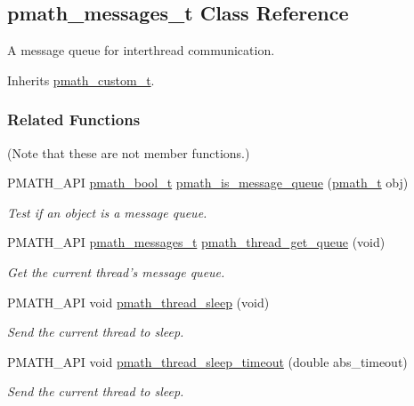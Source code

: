\hypertarget{classpmath__messages__t}{
\subsection{pmath\_\-messages\_\-t Class Reference}
\label{classpmath__messages__t}
}
A message queue for interthread communication.  


Inherits \hyperlink{classpmath__custom__t}{pmath\_\-custom\_\-t}.

\subsubsection*{Related Functions}
(Note that these are not member functions.) \begin{CompactItemize}
\item 
PMATH\_\-API \hyperlink{group__general__types_gc92090cb0b56345d6c379ed2341d4ef4}{pmath\_\-bool\_\-t} \hyperlink{group__threadmsg_g93b45ad8c3063c94602c8bbaaf3c2613}{pmath\_\-is\_\-message\_\-queue} (\hyperlink{classpmath__t}{pmath\_\-t} obj)
\begin{CompactList}\small\item\em Test if an object is a message queue. \item\end{CompactList}\item 
PMATH\_\-API \hyperlink{classpmath__messages__t}{pmath\_\-messages\_\-t} \hyperlink{group__threadmsg_gf4d69db0ffe06846e57df7cadcd3dab6}{pmath\_\-thread\_\-get\_\-queue} (void)
\begin{CompactList}\small\item\em Get the current thread's message queue. \item\end{CompactList}\item 
PMATH\_\-API void \hyperlink{group__threadmsg_gce6da6e34b0aeab35094ddccdd9a3e55}{pmath\_\-thread\_\-sleep} (void)
\begin{CompactList}\small\item\em Send the current thread to sleep. \item\end{CompactList}\item 
PMATH\_\-API void \hyperlink{group__threadmsg_g199f3dc07d4b89174e641fa4b0b757db}{pmath\_\-thread\_\-sleep\_\-timeout} (double abs\_\-timeout)
\begin{CompactList}\small\item\em Send the current thread to sleep. \item\end{CompactList}\item 

\end{CompactItemize}
